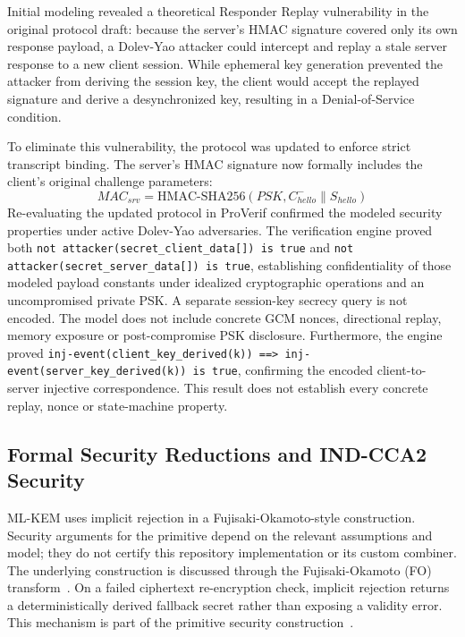 \documentclass[journal, 10pt]{IEEEtran}
\begin{document}
Initial modeling revealed a theoretical Responder Replay vulnerability in the original protocol draft: because the server's HMAC signature covered only its own response payload, a Dolev-Yao attacker could intercept and replay a stale server response to a new client session. While ephemeral key generation prevented the attacker from deriving the session key, the client would accept the replayed signature and derive a desynchronized key, resulting in a Denial-of-Service condition.

To eliminate this vulnerability, the protocol was updated to enforce strict transcript binding. The server's HMAC signature now formally includes the client's original challenge parameters:
\begin{equation}
MAC_{srv} = \text{HMAC-SHA256}(PSK, C_{hello}^{-} \parallel S_{hello})
\end{equation}
Re-evaluating the updated protocol in ProVerif confirmed the modeled security properties under active Dolev-Yao adversaries. The verification engine proved both \texttt{not attacker(secret\_client\_data[]) is true} and \texttt{not attacker(secret\_server\_data[]) is true}, establishing confidentiality of those modeled payload constants under idealized cryptographic operations and an uncompromised private PSK. A separate session-key secrecy query is not encoded. The model does not include concrete GCM nonces, directional replay, memory exposure or post-compromise PSK disclosure. Furthermore, the engine proved \texttt{inj-event(client\_key\_derived(k)) ==> inj-event(server\_key\_derived(k)) is true}, confirming the encoded client-to-server injective correspondence. This result does not establish every concrete replay, nonce or state-machine property.



\subsection{Formal Security Reductions and IND-CCA2 Security}
ML-KEM uses implicit rejection in a Fujisaki-Okamoto-style construction. Security arguments for the primitive depend on the relevant assumptions and model; they do not certify this repository implementation or its custom combiner. The underlying construction is discussed through the Fujisaki-Okamoto (FO) transform~\cite{b4,b23}. On a failed ciphertext re-encryption check, implicit rejection returns a deterministically derived fallback secret rather than exposing a validity error. This mechanism is part of the primitive security construction~\cite{b4}.
\end{document}
